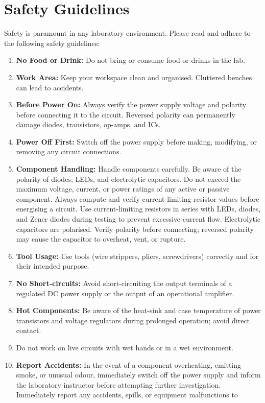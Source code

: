 \chapter*{Safety Guidelines}
Safety is paramount in any laboratory environment. Please read and adhere to the following safety guidelines:
\begin{safetybox}
	\begin{enumerate}[label=\arabic*.]
		\item \textbf{No Food or Drink:} Do not bring or consume food or drinks in the lab.
		\item \textbf{Work Area:} Keep your workspace clean and organised. Cluttered benches can lead to accidents.
		\item \textbf{Before Power On:} Always verify the power supply voltage and polarity before connecting it to the circuit. Reversed polarity can permanently damage diodes, transistors, op-amps, and ICs.
		\item \textbf{Power Off First:} Switch off the power supply before making, modifying, or removing any circuit connections.
		\item \textbf{Component Handling:} Handle components carefully. Be aware of the polarity of diodes,
		LEDs, and electrolytic capacitors. Do not exceed the maximum voltage, current, or power ratings of any active or passive component. Always compute and verify current-limiting resistor values before energising a circuit. Use current-limiting resistors in series with LEDs, diodes, and Zener diodes during testing to prevent excessive current flow. Electrolytic capacitors are polarised. Verify polarity before connecting; reversed polarity may cause the capacitor to overheat, vent, or rupture.
		\item \textbf{Tool Usage:} Use tools (wire strippers, pliers, screwdrivers) correctly and for their intended
		purpose.
		\item \textbf{No Short-circuits:} Avoid short-circuiting the output terminals of a regulated DC power supply or the output of an operational amplifier.
		\item \textbf{Hot Components:} Be aware of the heat-sink and case temperature of power transistors and voltage regulators during prolonged operation; avoid direct contact.
		\item Do not work on live circuits with wet hands or in a wet environment.
		\item \textbf{Report Accidents:} In the event of a component overheating, emitting smoke, or unusual odour, immediately switch off the power supply and inform the laboratory instructor before attempting further investigation. Immediately report any accidents, spills, or equipment malfunctions to

\end{enumerate}
\end{safetybox}
